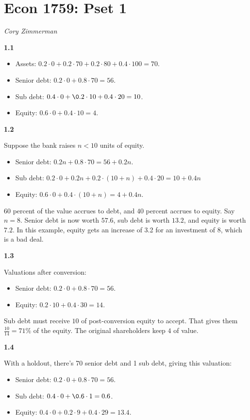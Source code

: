\documentclass[11pt]{article}
\begin{document}
        \section*{Econ 1759: Pset 1}
        \textit{Cory Zimmerman}

\textbf{1.1}
\begin{itemize}
  \item Assets: $0.2 \cdot 0 + 0.2 \cdot 70 + 0.2 \cdot 80 + 0.4 \cdot 100 = 70$.
  \item Senior debt: $0.2 \cdot 0 + 0.8 \cdot 70 = 56$. 
  \item Sub debt: $0.4 \cdot 0 + \0.2 \cdot 10 + 0.4 \cdot 20 = 10$.
  \item Equity: $0.6 \cdot 0 + 0.4 \cdot 10 = 4$.
\end{itemize}

\textbf{1.2}

Suppose the bank raises $n < 10$ units of equity. 
\begin{itemize}
  \item Senior debt: $0.2n + 0.8 \cdot 70 = 56 + 0.2n$. 
  \item Sub debt: $0.2 \cdot 0 + 0.2n + 0.2 \cdot (10 + n) + 0.4 \cdot 20 = 10 + 0.4n$
  \item Equity: $0.6 \cdot 0 + 0.4 \cdot (10 + n) = 4 + 0.4n$.
\end{itemize}

$60$ percent of the value accrues to debt, and $40$ percent accrues to equity. Say $n = 8$. Senior debt is now worth $57.6$, sub debt is worth $13.2$, and equity is worth $7.2$. In this example, equity gets an increase of 3.2 for an investment of 8, which is a bad deal.

\textbf{1.3}

Valuations after conversion:
\begin{itemize}
  \item Senior debt: $0.2 \cdot 0 + 0.8 \cdot 70 = 56$. 
  \item Equity: $0.2 \cdot 10 + 0.4 \cdot 30 = 14$.
\end{itemize}

Sub debt must receive $10$ of post-conversion equity to accept. That gives them $\frac{10}{14} = 71\%$ of the equity. The original shareholders keep $4$ of value. 

\textbf{1.4}

With a holdout, there's 70 senior debt and 1 sub debt, giving this valuation: 

\begin{itemize}
  \item Senior debt: $0.2 \cdot 0 + 0.8 \cdot 70 = 56$. 
  \item Sub debt: $0.4 \cdot 0 + \0.6 \cdot 1 = 0.6$.
  \item Equity: $0.4 \cdot 0 + 0.2 \cdot 9 + 0.4 \cdot 29 = 13.4$.
\end{itemize}
\end{document}

